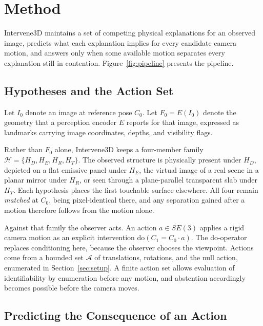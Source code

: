 \documentclass{article} %
\theoremstyle{defstyle}
\theoremstyle{plain}
\begin{document}
\section{Method}
\label{sec:method}

Intervene3D maintains a set of competing physical explanations for an observed image, predicts
what each explanation implies for every candidate camera motion, and answers only when some
available motion separates every explanation still in contention. Figure~\ref{fig:pipeline}
presents the pipeline.

\subsection{Hypotheses and the Action Set}
\label{sec:formulation}

Let $I_0$ denote an image at reference pose $C_0$. Let $F_0 = E(I_0)$ denote the geometry that
a perception encoder $E$ reports for that image, expressed as landmarks carrying image
coordinates, depths, and visibility flags. \begin{definition}\label{def:hypotheses} Rather than $F_0$ alone, Intervene3D keeps a four-member family
$\mathcal{H} = \{H_D, H_E, H_R, H_T\}$. The observed structure is physically present under
$H_D$, depicted on a flat emissive panel under $H_E$, the virtual image of a real scene in a
planar mirror under $H_R$, or seen through a plane-parallel transparent slab under $H_T$. Each
hypothesis places the first touchable surface elsewhere. All four remain \emph{matched} at
$C_0$, being pixel-identical there, and any separation gained after a motion therefore follows
from the motion alone.
\end{definition} Against that family the observer acts. An action $a \in SE(3)$ applies a rigid
camera motion as an explicit intervention $\mathrm{do}(C_1 = C_0 \cdot a)$. The do-operator
replaces conditioning here, because the observer chooses the viewpoint. Actions come from a
bounded set $\mathcal{A}$ of translations, rotations, and the null action, enumerated in
Section~\ref{sec:setup}. A finite action set allows evaluation of identifiability by
enumeration before any motion, and abstention accordingly becomes possible before the camera
moves.

\subsection{Predicting the Consequence of an Action}
\label{sec:transition}
\end{document}
